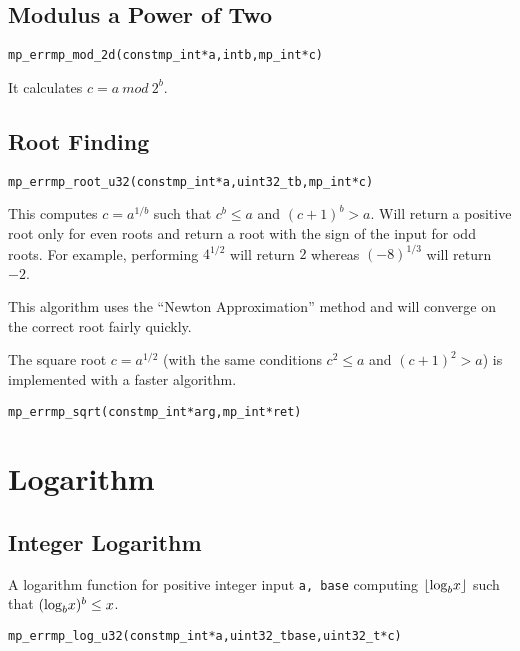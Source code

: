\documentclass[synpaper]{book}
\def\log{{\rm log}}
\def\mod{{\mathit\ mod\ }}
\newcommand{\floor}[1]{\left\lfloor{#1}\right\rfloor}
\begin{document}
\section{Modulus a Power of Two}
\begin{alltt}
mp_err mp_mod_2d(const mp_int *a, int b, mp_int *c)
\end{alltt}
It calculates $c = a \mod 2^b$.

\section{Root Finding}
\begin{alltt}
mp_err mp_root_u32(const mp_int *a, uint32_t b, mp_int *c)
\end{alltt}
This computes $c = a^{1/b}$ such that $c^b \le a$ and $(c+1)^b > a$. Will return a positive root
only for even roots and return a root with the sign of the input for odd roots.  For example,
performing $4^{1/2}$ will return $2$ whereas $(-8)^{1/3}$ will return $-2$.

This algorithm uses the ``Newton Approximation'' method and will converge on the correct root
fairly quickly.

The square root  $c = a^{1/2}$ (with the same conditions $c^2 \le a$ and $(c+1)^2 > a$) is
implemented with a faster algorithm.

\begin{alltt}
mp_err mp_sqrt(const mp_int *arg, mp_int *ret)
\end{alltt}

\chapter{Logarithm}
\section{Integer Logarithm}
A logarithm function for positive integer input \texttt{a, base} computing  $\floor{\log_bx}$ such
that $(\log_b x)^b \le x$.

\begin{alltt}
mp_err mp_log_u32(const mp_int *a, uint32_t base, uint32_t *c)
\end{alltt}
\end{document}
